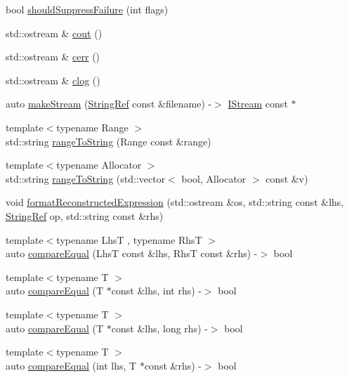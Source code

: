 \begin{DoxyCompactItemize}
\item 
bool \mbox{\hyperlink{namespace_catch_ab91eb13081203d634fe48d3d2ab386d7}{should\+Suppress\+Failure}} (int flags)
\item 
std\+::ostream \& \mbox{\hyperlink{namespace_catch_a50af73c5a37ad5c6558df4ce4a275e83}{cout}} ()
\item 
std\+::ostream \& \mbox{\hyperlink{namespace_catch_a4e5b5dc07abdfa30de33593dfab71f43}{cerr}} ()
\item 
std\+::ostream \& \mbox{\hyperlink{namespace_catch_a5a0677089050dcdb4848f56fb47e9279}{clog}} ()
\item 
auto \mbox{\hyperlink{namespace_catch_af6d27462573d60c30c51acf1c980e3ff}{make\+Stream}} (\mbox{\hyperlink{class_catch_1_1_string_ref}{String\+Ref}} const \&filename) -\/$>$ \mbox{\hyperlink{struct_catch_1_1_i_stream}{I\+Stream}} const $\ast$
\item 
{\footnotesize template$<$typename Range $>$ }\\std\+::string \mbox{\hyperlink{namespace_catch_af13494e925a793e3e7143c6ce6f442c2}{range\+To\+String}} (Range const \&range)
\item 
{\footnotesize template$<$typename Allocator $>$ }\\std\+::string \mbox{\hyperlink{namespace_catch_ae162dc66b7767a52e7e4283915fd3d9f}{range\+To\+String}} (std\+::vector$<$ bool, Allocator $>$ const \&v)
\item 
void \mbox{\hyperlink{namespace_catch_a520110c31f26cf9892595772ab814fc0}{format\+Reconstructed\+Expression}} (std\+::ostream \&os, std\+::string const \&lhs, \mbox{\hyperlink{class_catch_1_1_string_ref}{String\+Ref}} op, std\+::string const \&rhs)
\item 
{\footnotesize template$<$typename LhsT , typename RhsT $>$ }\\auto \mbox{\hyperlink{namespace_catch_af89b8df30cfaf09abd048c6ff67359ee}{compare\+Equal}} (LhsT const \&lhs, RhsT const \&rhs) -\/$>$ bool
\item 
{\footnotesize template$<$typename T $>$ }\\auto \mbox{\hyperlink{namespace_catch_a68f451c45e65f242dde5f21c19a4cf7a}{compare\+Equal}} (T $\ast$const \&lhs, int rhs) -\/$>$ bool
\item 
{\footnotesize template$<$typename T $>$ }\\auto \mbox{\hyperlink{namespace_catch_afca4a005e1053c542462dc7a603b41b3}{compare\+Equal}} (T $\ast$const \&lhs, long rhs) -\/$>$ bool
\item 
{\footnotesize template$<$typename T $>$ }\\auto \mbox{\hyperlink{namespace_catch_a6af99378569fc6f68270b6af669f1c3b}{compare\+Equal}} (int lhs, T $\ast$const \&rhs) -\/$>$ bool

\end{DoxyCompactItemize}
